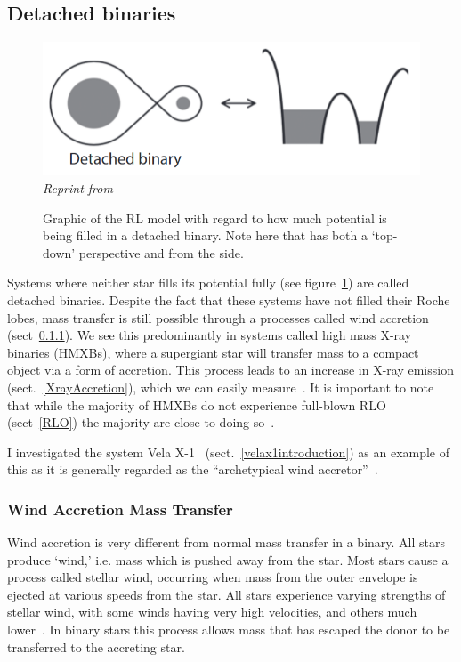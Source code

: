 \documentclass[12pt, a4paper]{article}
\begin{document}
        \subsection{Detached binaries}\label{DetachedBinary}

        \begin{figure}[H]
            \centering
            \includegraphics[scale = .4]{figs/reused-figs/Tauris_DetachedBinary.png}\\
            \textit{Reprint from~\parencite{TaurisvandenHeuvel+2023}}
            \caption{Graphic of the RL model with regard to how much potential is being filled in a detached binary. Note here that has both a `top-down' perspective and from the side.}
            \label{DetachedBinaryRL}
        \end{figure}

        Systems where neither star fills its potential fully (see figure~\ref{DetachedBinaryRL}) are called detached binaries. Despite the fact that these systems have not filled their Roche lobes, mass transfer is still possible through a processes called wind accretion (sect~\ref{WindAccretion}). We see this predominantly in systems called high mass X-ray binaries (HMXBs), where a supergiant star will transfer mass to a compact object via a form of accretion. This process leads to an increase in X-ray emission (sect.~\ref{XrayAccretion}), which we can easily measure~\parencite{TaurisvandenHeuvel+2023}. It is important to note that while the majority of HMXBs do not experience full-blown RLO (sect~\ref{RLO}) the majority are close to doing so~\parencite{TaurisvandenHeuvel+2023}. 

        I investigated the system Vela X-1~\parencite{Kretschmar_2021} (sect.~\ref{velax1introduction}) as an example of this as it is generally regarded as the ``archetypical wind accretor''~\parencite{Kretschmar_2021}. 

        \subsubsection{Wind Accretion Mass Transfer} \label{WindAccretion}
        Wind accretion is very different from normal mass transfer in a binary. All stars produce `wind,' i.e. mass which is pushed away from the star. Most stars cause a process called stellar wind, occurring when mass from the outer envelope is ejected at various speeds from the star. All stars experience varying strengths of stellar wind, with some winds having very high velocities, and others much lower~\parencite{Lamers_1999}. In binary stars this process allows mass that has escaped the donor to be transferred to the accreting star.
\end{document}
